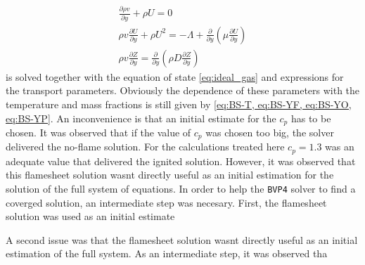\begin{gather}
	\frac{\partial\rho v}{\partial y} +  \rho U = 0\\ \label{eq:OneDimCont2}%
	\rho v \frac{\partial U}{\partial y} + \rho U^2 =
	- \Lambda
	+ \frac{\partial}{\partial y}\left(\mu \frac{\partial U}{\partial y}\right)\\ \label{eq:OneDimMom2}%
    	\rho v \frac{\partial Z}{\partial y} = 
	\frac{\partial}{\partial y}\left(\rho D \frac{\partial Z}{\partial y}\right)
\end{gather}\label{eqs:OneDimEquationsMixtureFraction}
is solved together  with the equation of state \cref{eq:ideal_gas} and expressions for the transport parameters. Obviously the dependence of these parameters with the temperature and mass fractions is still given by \cref{eq:BS-T, eq:BS-YF, eq:BS-YO, eq:BS-YP}. 
An inconvenience is that an initial estimate for the $c_p$ has to be chosen. It was observed that if the value of $c_p$ was chosen too big, the solver delivered the no-flame solution. For the calculations treated here $c_p = 1.3$ was an adequate value that delivered the ignited solution. However, it was observed that this flamesheet solution wasnt directly useful as an initial estimation for the solution of the full system of equations. In order to help  the \lstinline|BVP4| solver to find a coverged solution, an intermediate step was necesary. First, the flamesheet solution was used as an initial estimate



A second issue was that the flamesheet solution wasnt directly useful as an initial estimation of the full system. As an intermediate step, it was observed tha


